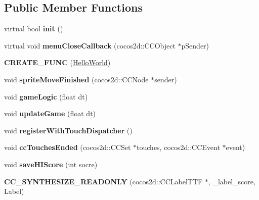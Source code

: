 \subsection*{Public Member Functions}
\begin{DoxyCompactItemize}
\item 
\hypertarget{class_hello_world_a65e2b1525051f3690e5a39ca56608a97}{virtual bool {\bfseries init} ()}\label{class_hello_world_a65e2b1525051f3690e5a39ca56608a97}

\item 
\hypertarget{class_hello_world_ac88013a4ebdccc7acac68a0090767907}{virtual void {\bfseries menu\-Close\-Callback} (cocos2d\-::\-C\-C\-Object $\ast$p\-Sender)}\label{class_hello_world_ac88013a4ebdccc7acac68a0090767907}

\item 
\hypertarget{class_hello_world_a857ebfbc49f3a7f81772bee4991d186b}{{\bfseries C\-R\-E\-A\-T\-E\-\_\-\-F\-U\-N\-C} (\hyperlink{class_hello_world}{Hello\-World})}\label{class_hello_world_a857ebfbc49f3a7f81772bee4991d186b}

\item 
\hypertarget{class_hello_world_a29621d88809f5bdf80cacb1d5f57231b}{void {\bfseries sprite\-Move\-Finished} (cocos2d\-::\-C\-C\-Node $\ast$sender)}\label{class_hello_world_a29621d88809f5bdf80cacb1d5f57231b}

\item 
\hypertarget{class_hello_world_a8492d6408d15c574bf08d14b233a8ab9}{void {\bfseries game\-Logic} (float dt)}\label{class_hello_world_a8492d6408d15c574bf08d14b233a8ab9}

\item 
\hypertarget{class_hello_world_a528e70a502eceb5269274719f68e9408}{void {\bfseries update\-Game} (float dt)}\label{class_hello_world_a528e70a502eceb5269274719f68e9408}

\item 
\hypertarget{class_hello_world_a8565b3315dfade31519c51f63b821719}{void {\bfseries register\-With\-Touch\-Dispatcher} ()}\label{class_hello_world_a8565b3315dfade31519c51f63b821719}

\item 
\hypertarget{class_hello_world_ad7e69aca388dfbd2579a29d0650f7332}{void {\bfseries cc\-Touches\-Ended} (cocos2d\-::\-C\-C\-Set $\ast$touches, cocos2d\-::\-C\-C\-Event $\ast$event)}\label{class_hello_world_ad7e69aca388dfbd2579a29d0650f7332}

\item 
\hypertarget{class_hello_world_abb9cf51e25bbc6d8a3e5739aedabbe85}{void {\bfseries save\-H\-I\-Score} (int socre)}\label{class_hello_world_abb9cf51e25bbc6d8a3e5739aedabbe85}

\item 
\hypertarget{class_hello_world_a431ab33d281579d4a38283485c8ae438}{{\bfseries C\-C\-\_\-\-S\-Y\-N\-T\-H\-E\-S\-I\-Z\-E\-\_\-\-R\-E\-A\-D\-O\-N\-L\-Y} (cocos2d\-::\-C\-C\-Label\-T\-T\-F $\ast$, \-\_\-label\-\_\-score, Label)}\label{class_hello_world_a431ab33d281579d4a38283485c8ae438}

\end{DoxyCompactItemize}

